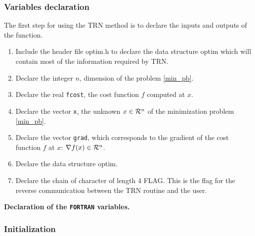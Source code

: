 \documentclass[a4paper,twoside,final,onecolumn,11pt,openright]{article}
\def \mathbb #1{{\cal #1}}
\begin{document}
\subsubsection{Variables declaration}
The first step for using the TRN method is to declare the inputs and outputs of the function. 
\begin{enumerate}
 \item Include the header file optim.h to declare the data structure optim which will contain most of the information required by TRN.
 \item Declare the integer $n$, dimension of the problem \eqref{min_pb}.
 \item Declare the real \texttt{fcost}, the cost function $f$ computed at $x$.
 \item Declare the vector \texttt{x}, the unknown $x \in \mathbb{R}^{n}$ of the minimization problem \eqref{min_pb}.
 \item Declare the vector \texttt{grad}, which corresponds to the gradient of the cost function $f$ at $x$: $\nabla f(x) \in \mathbb{R}^{n}$.
 \item Declare the data structure optim.
 \item Declare the chain of character of length 4 FLAG. This is the flag for the reverse communication between the TRN routine and the user.
\end{enumerate}

\framebox{
\small
 
} 
\normalsize
\begin{center}
\textbf{Declaration of the \texttt{FORTRAN} variables.} 
\end{center}

\subsubsection{Initialization}
\end{document}

